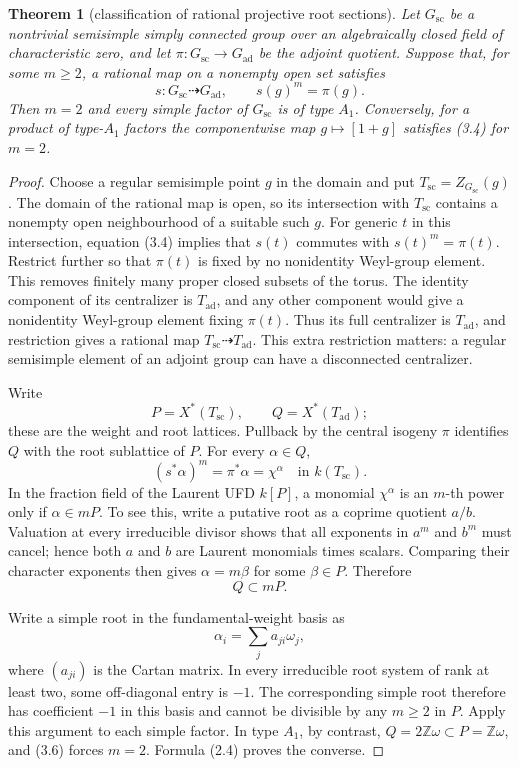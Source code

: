 \documentclass[11pt,reqno]{amsart}
\newtheorem{theorem}{Theorem}[section]
\theoremstyle{definition}
\theoremstyle{remark}
\newcommand{\Z}{\mathbb Z}
\newcommand{\ssc}{\mathrm{sc}}
\newcommand{\aad}{\mathrm{ad}}
\begin{document}
\begin{theorem}[classification of rational projective root sections]\label{thm:root-no-go}
Let \(G_{\ssc}\) be a nontrivial semisimple simply connected group over an
algebraically closed field of characteristic zero, and let
\(\pi:G_{\ssc}\to G_{\aad}\) be the adjoint quotient.  Suppose that, for some
\(m\ge2\), a rational map on a nonempty open set satisfies
\[
 s:G_{\ssc}\dashrightarrow G_{\aad},
 \qquad s(g)^m=\pi(g).
\tag{3.4}
\]
Then \(m=2\) and every simple factor of \(G_{\ssc}\) is of type \(A_1\).
Conversely, for a product of type-\(A_1\) factors the componentwise map
\(g\mapsto[1+g]\) satisfies (3.4) for \(m=2\).
\end{theorem}

\begin{proof}
Choose a regular semisimple point \(g\) in the domain and put
\(T_{\ssc}=Z_{G_{\ssc}}(g)\).  The domain of the rational map is open, so its
intersection with \(T_{\ssc}\) contains a nonempty open neighbourhood of a
suitable such \(g\).  For generic \(t\) in this intersection, equation (3.4)
implies that \(s(t)\) commutes with \(s(t)^m=\pi(t)\).
Restrict further so that \(\pi(t)\) is fixed by no nonidentity Weyl-group
element.  This removes finitely many proper closed subsets of the torus.
The identity component of its centralizer is \(T_{\aad}\), and any other
component would give a nonidentity Weyl-group element fixing \(\pi(t)\).
Thus its full centralizer is \(T_{\aad}\), and restriction gives a rational
map \(T_{\ssc}\dashrightarrow T_{\aad}\).  This extra restriction matters:
a regular semisimple element of an adjoint group can have a disconnected
centralizer.

Write
\[
 P=X^*(T_{\ssc}),\qquad Q=X^*(T_{\aad});
\]
these are the weight and root lattices.  Pullback by the central isogeny
\(\pi\) identifies \(Q\) with the root sublattice of \(P\).  For every
\(\alpha\in Q\),
\[
 (s^*\alpha)^m=\pi^*\alpha=\chi^\alpha
\quad\text{in }k(T_{\ssc}).
\tag{3.5}
\]
In the fraction field of the Laurent UFD \(k[P]\), a monomial
\(\chi^\alpha\) is an \(m\)-th power only if \(\alpha\in mP\).  To see this,
write a putative root as a coprime quotient \(a/b\).  Valuation at every
irreducible divisor shows that all exponents in \(a^m\) and \(b^m\) must
cancel; hence both \(a\) and \(b\) are Laurent monomials times scalars.
Comparing their character exponents then gives \(\alpha=m\beta\) for some
\(\beta\in P\).  Therefore
\[
 Q\subset mP.
\tag{3.6}
\]

Write a simple root in the fundamental-weight basis as
\[
 \alpha_i=\sum_j a_{ji}\omega_j,
\]
where \((a_{ji})\) is the Cartan matrix.  In every irreducible root system
of rank at least two, some off-diagonal entry is \(-1\).  The corresponding
simple root therefore has coefficient \(-1\) in this basis and cannot be
divisible by any \(m\ge2\) in \(P\).  Apply this argument to each simple
factor.  In type \(A_1\), by contrast,
\(Q=2\Z\omega\subset P=\Z\omega\), and (3.6) forces \(m=2\).  Formula
(2.4) proves the converse.
\end{proof}
\end{document}
